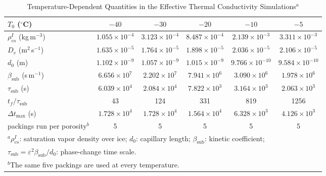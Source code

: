 \begin{table}
\caption{Temperature-Dependent Quantities in the Effective Thermal Conductivity Simulations$^{a}$}
\centering
\begin{tabular}{l c c c c c}
\hline
 $T_0$ ($^\circ$C) & $-40$ & $-30$ & $-20$ & $-10$ & $-5$ \\
\hline
 $\rho_{vs}^{I}$ (kg\,m$^{-3}$) & $1.055 \times 10^{-4}$ & $3.123 \times 10^{-4}$ & $8.487 \times 10^{-4}$ & $2.139 \times 10^{-3}$ & $3.311 \times 10^{-3}$ \\
 $D_v$ (m$^{2}$\,s$^{-1}$) & $1.635 \times 10^{-5}$ & $1.764 \times 10^{-5}$ & $1.898 \times 10^{-5}$ & $2.036 \times 10^{-5}$ & $2.106 \times 10^{-5}$ \\
 $d_0$ (m) & $1.102 \times 10^{-9}$ & $1.057 \times 10^{-9}$ & $1.015 \times 10^{-9}$ & $9.766 \times 10^{-10}$ & $9.584 \times 10^{-10}$ \\
 $\beta_{\mathrm{sub}}$ (s\,m$^{-1}$) & $6.656 \times 10^{7}$ & $2.202 \times 10^{7}$ & $7.941 \times 10^{6}$ & $3.090 \times 10^{6}$ & $1.978 \times 10^{6}$ \\
 $\tau_{\mathrm{sub}}$ (s) & $6.039 \times 10^{4}$ & $2.084 \times 10^{4}$ & $7.822 \times 10^{3}$ & $3.164 \times 10^{3}$ & $2.063 \times 10^{3}$ \\
 $t_f/\tau_{\mathrm{sub}}$ & 43 & 124 & 331 & 819 & 1256 \\
 $\Delta t_{\max}$ (s) & $1.728 \times 10^{4}$ & $1.728 \times 10^{4}$ & $1.564 \times 10^{4}$ & $6.328 \times 10^{3}$ & $4.126 \times 10^{3}$ \\
 packings run per porosity$^{b}$ & 5 & 5 & 5 & 5 & 5 \\
\hline
\multicolumn{6}{l}{$^{a}$$\rho_{vs}^{I}$: saturation vapor density over ice; $d_0$: capillary length; $\beta_{\mathrm{sub}}$: kinetic coefficient;} \\
\multicolumn{6}{l}{\hphantom{$^{a}$}$\tau_{\mathrm{sub}} = \varepsilon^2 \beta_{\mathrm{sub}}/d_0$: phase-change time scale.} \\
\multicolumn{6}{l}{$^{b}$The same five packings are used at every temperature.}
\end{tabular}
\label{tab:keff_temperature}
\end{table}
